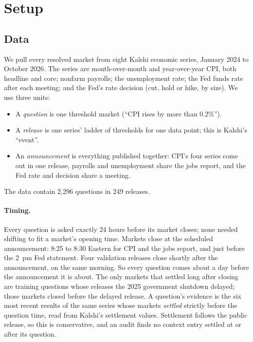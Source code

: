 \documentclass[11pt]{article}
\begin{document}
\section{Setup}
\label{sec:setup}

\subsection{Data}

We pull every resolved market from eight Kalshi economic series, January 2024 to October 2026. The series are month-over-month and year-over-year CPI, both headline and core; nonfarm payrolls; the unemployment rate; the Fed funds rate after each meeting; and the Fed's rate decision (cut, hold or hike, by size). We use three units:
\begin{itemize}[leftmargin=*]
\item A \emph{question} is one threshold market (``CPI rises by more than 0.2\%'').
\item A \emph{release} is one series' ladder of thresholds for one data point; this is Kalshi's ``event''.
\item An \emph{announcement} is everything published together: CPI's four series come out in one release, payrolls and unemployment share the jobs report, and the Fed rate and decision share a meeting.
\end{itemize}
The data contain 2,296 questions in 249 releases.

\paragraph{Timing.} Every question is asked exactly 24 hours before its market closes; none needed shifting to fit a market's opening time. Markets close at the scheduled announcement: 8:25 to 8:30 Eastern for CPI and the jobs report, and just before the 2~pm Fed statement. Four validation releases close shortly after the announcement, on the same morning. So every question comes about a day before the announcement it is about. The only markets that settled long after closing are training questions whose releases the 2025 government shutdown delayed; those markets closed before the delayed release. A question's evidence is the six most recent results of the same series whose markets \emph{settled} strictly before the question time, read from Kalshi's settlement values. Settlement follows the public release, so this is conservative, and an audit finds no context entry settled at or after its question.
\end{document}
